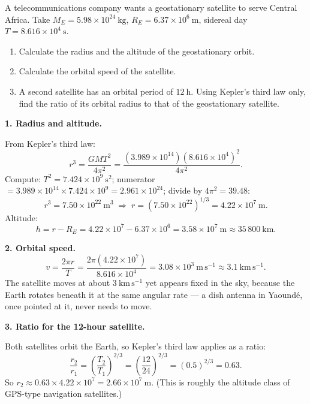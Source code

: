\documentclass[11pt]{article}
\begin{document}
\begin{exoresolu}
A telecommunications company wants a geostationary satellite to serve Central Africa. Take $M_E = 5.98\times 10^{24}\ \mathrm{kg}$, $R_E = 6.37\times 10^{6}\ \mathrm{m}$, sidereal day $T = 8.616\times 10^{4}\ \mathrm{s}$.
\begin{enumerate}
\item Calculate the radius and the altitude of the geostationary orbit.
\item Calculate the orbital speed of the satellite.
\item A second satellite has an orbital period of $12\ \mathrm{h}$. Using Kepler's third law only, find the ratio of its orbital radius to that of the geostationary satellite.
\end{enumerate}
\tcblower
\textbf{1. Radius and altitude.}

From Kepler's third law:
\[ r^{3} = \frac{GM T^{2}}{4\pi^{2}} = \frac{(3.989\times 10^{14})(8.616\times 10^{4})^{2}}{4\pi^{2}}. \]
Compute: $T^{2} = 7.424\times 10^{9}\ \mathrm{s^{2}}$; numerator $= 3.989\times 10^{14}\times 7.424\times 10^{9} = 2.961\times 10^{24}$; divide by $4\pi^{2} = 39.48$:
\[ r^{3} = 7.50\times 10^{22}\ \mathrm{m^{3}} \;\Rightarrow\; r = (7.50\times 10^{22})^{1/3} = 4.22\times 10^{7}\ \mathrm{m}. \]
Altitude:
\[ h = r - R_E = 4.22\times 10^{7} - 6.37\times 10^{6} = 3.58\times 10^{7}\ \mathrm{m} \approx 35\,800\ \mathrm{km}. \]

\textbf{2. Orbital speed.}
\[ v = \frac{2\pi r}{T} = \frac{2\pi(4.22\times 10^{7})}{8.616\times 10^{4}} = 3.08\times 10^{3}\ \mathrm{m\,s^{-1}} \approx 3.1\ \mathrm{km\,s^{-1}}. \]
The satellite moves at about $3\ \mathrm{km\,s^{-1}}$ yet appears fixed in the sky, because the Earth rotates beneath it at the same angular rate — a dish antenna in Yaoundé, once pointed at it, never needs to move.

\textbf{3. Ratio for the 12-hour satellite.}

Both satellites orbit the Earth, so Kepler's third law applies as a ratio:
\[ \frac{r_2}{r_1} = \left(\frac{T_2}{T_1}\right)^{2/3} = \left(\frac{12}{24}\right)^{2/3} = (0.5)^{2/3} = 0.63. \]
So $r_2 \approx 0.63\times 4.22\times 10^{7} = 2.66\times 10^{7}\ \mathrm{m}$. (This is roughly the altitude class of GPS-type navigation satellites.)
\end{exoresolu}
\end{document}
